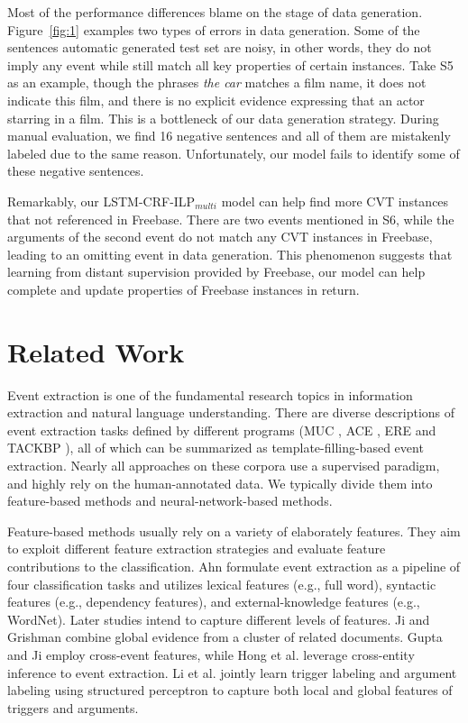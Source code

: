 \documentclass{article}
\begin{document}
Most of the performance differences blame on the stage of data generation. Figure~\ref{fig:1} examples two types of errors in data generation. Some of the sentences automatic generated test set are noisy, in other words, they do not imply any event while still match all key properties of certain instances. Take S5 as an example, though the phrases \emph{the car} matches a film name, it does not indicate this film, and there is no explicit evidence expressing that an actor starring in a film. This is a bottleneck of our data generation strategy. During manual evaluation, we find 16 negative sentences and all of them are mistakenly labeled due to the same reason. Unfortunately, our model fails to identify some of these negative sentences.

Remarkably, our LSTM-CRF-ILP$_{multi}$ model can help find more CVT instances that not referenced in Freebase. There are two events mentioned in S6, while the arguments of the second event do not match any CVT instances in Freebase, leading to an omitting event in data generation. This phenomenon suggests that learning from distant supervision provided by Freebase, our model can help complete and update properties of Freebase instances in return.

\section{Related Work}
Event extraction is one of the fundamental research topics in information extraction and natural language understanding. There are diverse descriptions of event extraction tasks defined by different programs (MUC \cite{grishman1996message}, ACE \cite{doddington2004automatic}, ERE \cite{song2015light} and TACKBP \cite{mitamura2015event}), all of which can be summarized as template-filling-based event extraction. Nearly all approaches on these corpora use a supervised paradigm, and highly rely on the human-annotated data. We typically divide them into feature-based methods and neural-network-based methods. 

Feature-based methods usually rely on a variety of elaborately features. They aim to exploit different feature extraction strategies and evaluate feature contributions to the classification. Ahn  formulate event extraction as a pipeline of four classification tasks and utilizes lexical features (e.g., full word), syntactic features (e.g., dependency features), and external-knowledge features (e.g., WordNet). Later studies intend to capture different levels of features. Ji and Grishman  combine global evidence from a cluster of related documents. Gupta and Ji  employ cross-event features, while Hong et al.  leverage cross-entity inference to event extraction. Li et al.  jointly learn trigger labeling and argument labeling using structured perceptron to capture both local and global features of triggers and arguments. 
\end{document}

